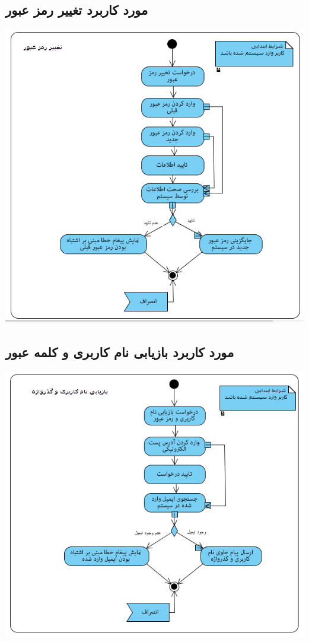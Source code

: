 \documentclass{article}
\begin{document}
\subsection*{مورد کاربرد تغییر رمز عبور}
\vspace{2cm}
\begin{center}
\includegraphics[width=\textwidth]{ActivityDiagrams/12.png}
\end{center}

\newpage
\vspace{2cm}
\subsection*{مورد کاربرد بازیابی نام کاربری و کلمه عبور}
\vspace{2cm}
\begin{center}
\includegraphics[width=\textwidth]{ActivityDiagrams/13.png}
\end{center}
\end{document}
